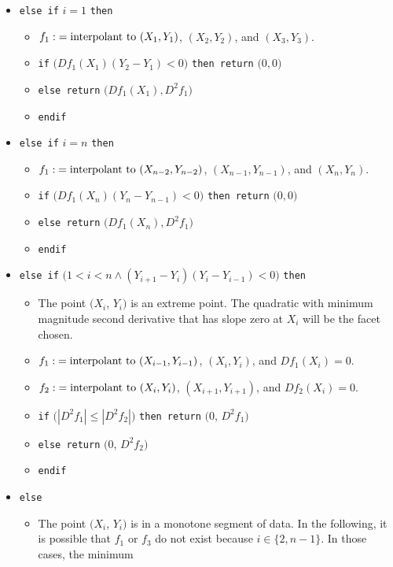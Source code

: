 {\begin{itemize}
\item[]{ {\tt else if} $i=1$ {\tt then}}
\begin{itemize}
\item[]{ $f_1\:\hbox{interpolant to }(X_1,Y_1)$,}
  $(X_2,Y_2)$, and $(X_3,Y_3)$.
\item[]{ {\tt if} $\bigl(Df_1(X_1)(Y_2-Y_1)<0\bigr)$ {\tt then return}
  $\bigl(0,0\bigr)$}
\item[]{ {\tt else return} $\bigl(Df_1(X_1),D^2f_1\bigr)$}
\item[]{ {\tt endif}
}
\end{itemize}
\item[]{ {\tt else if} $i=n$ {\tt then}}
\begin{itemize}
\item[]{ $f_1\:\hbox{interpolant to }(X_{n-2},Y_{n-2})$,
  $(X_{n-1},Y_{n-1})$, and $(X_n,Y_n)$.}
\item[]{ {\tt if} $\bigl(Df_1(X_n)(Y_n-Y_{n-1})<0\bigr)$ {\tt then return}
  $\bigl(0,0\bigr)$}
\item[]{ {\tt else return} $\bigl(Df_1(X_n),D^2f_1\bigr)$}
\item[]{ {\tt endif}}
\end{itemize}
\item[]{ {\tt else if} $\bigl(1<i<n\wedge (Y_{i+1} - Y_i)(Y_i - Y_{i-1}) < 0
\bigr)$ {\tt then}}
\begin{itemize}
\item[]{ The point $(X_i$, $Y_i)$ is an extreme point. The
quadratic with minimum magnitude second derivative that has slope
zero at $X_i$ will be the facet chosen.}
\item[]{ $f_1\:\hbox{interpolant to }(X_{i-1},Y_{i-1})$, $(X_i,Y_i)$,
  and $Df_1(X_i) = 0$.}
\item[]{ $f_2\:\hbox{interpolant to }(X_i,Y_i)$, $(X_{i+1},Y_{i+1})$,
  and $Df_2(X_i) = 0$.}
\item[]{ {\tt if} $\bigl(|D^2f_1| \leq |D^2f_2|\bigr)$ {\tt then
  return} $\bigl(0$, $D^2f_1\bigr)$}
\item[]{ {\tt else return} $\bigl(0$, $D^2f_2\bigr)$}
\item[]{ {\tt endif}}
\end{itemize}
\item[]{ {\tt else}}
\begin{itemize}
\item[]{ {The point $(X_i$, $Y_i)$ is in a monotone segment of
data. In the following, it is possible that $f_1$ or $f_3$ do
not exist because $i \in \{2, n-1\}$. In those cases, the minimum
}}
\end{itemize}
\end{itemize}}
